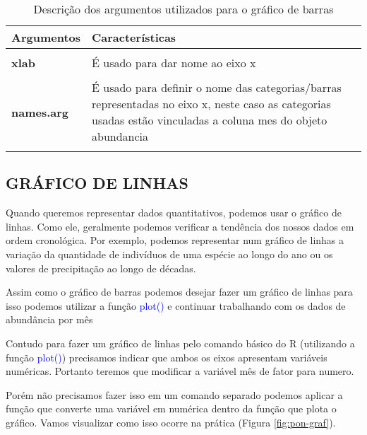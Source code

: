 \documentclass[titlepage, oneside, openany, a4paper]{book}
\begin{document}
\begin{table}

\caption{\label{tab:tab-arg}Descrição dos argumentos utilizados para o gráfico de barras}
\centering
\begin{tabular}[t]{>{}l>{\raggedright\arraybackslash}p{30em}}
\toprule
Argumentos & Características\\
\midrule
\textbf{\cellcolor{gray!6}{ylim}} & \cellcolor{gray!6}{Refere-se aos limites do eixo y}\\
\textbf{xlab} & É usado para dar nome ao eixo x\\
\textbf{\cellcolor{gray!6}{ylab}} & \cellcolor{gray!6}{É usado para dar nome ao eixo y}\\
\textbf{names.arg} & É usado para definir o nome das categorias/barras representadas no eixo x, neste caso as categorias usadas estão vinculadas a coluna mes do objeto abundancia\\
\textbf{\cellcolor{gray!6}{col}} & \cellcolor{gray!6}{É usado para definir a cor das barras}\\
\bottomrule
\end{tabular}
\end{table}

\hypertarget{gruxe1fico-de-linhas}{%
\subsection{GRÁFICO DE LINHAS}\label{gruxe1fico-de-linhas}}

Quando queremos representar dados quantitativos, podemos usar o gráfico de linhas. Como ele, geralmente podemos verificar a tendência dos nossos dados em ordem cronológica. Por exemplo, podemos representar num gráfico de linhas a variação da quantidade de indivíduos de uma espécie ao longo do ano ou os valores de precipitação ao longo de décadas.

Assim como o gráfico de barras podemos desejar fazer um gráfico de linhas para isso podemos utilizar a função \textcolor{blue}{plot()} e continuar trabalhando com os dados de abundância por mês

Contudo para fazer um gráfico de linhas pelo comando básico do R (utilizando a função \textcolor{blue}{plot()}) precisamos indicar que ambos os eixos apresentam variáveis numéricas. Portanto teremos que modificar a variável mês de fator para numero.

Porém não precisamos fazer isso em um comando separado podemos aplicar a função que converte uma variável em numérica dentro da função que plota o gráfico. Vamos visualizar como isso ocorre na prática (Figura \ref{fig:pon-graf}).
\end{document}

